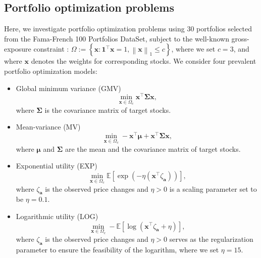 \documentclass[aos]{imsart}
\numberwithin{equation}{section}
\theoremstyle{plain}
\begin{document}
\subsection{Portfolio optimization problems}
Here, we investigate portfolio optimization problems using $30$ portfolios selected from the Fama-French 100 Portfolios DataSet, subject to the well-known gross-exposure constraint \cite{Fan2012Vast}:
$\Omega := \left\{\bm{x}: \bm{1}^{\top} \bm{x} = 1, \left\| \bm{x} \right\|_1 \leq c\right\}$,
where we set $c =3$, and where $\bm{x}$ denotes the weights for corresponding stocks. We consider four prevalent portfolio optimization models:
\begin{itemize}
        \item Global minimum variance (GMV)
        \begin{equation*}
            \min_{\bm{x} \in \Omega_c} \bm{x}^{\top} \bm{\Sigma} \bm{x},
        \end{equation*}
        where $\bm{\Sigma}$ is the covariance matrix of target stocks.

        \item Mean-variance (MV)
        \begin{equation*}
            \min_{\bm{x} \in \Omega_c}  -\bm{x}^{\top}\bm{\mu} + \bm{x}^{\top} \bm{\Sigma} \bm{x},
        \end{equation*}
        where $\bm{\mu}$ and $\bm{\Sigma}$ are the mean and the covariance matrix of target stocks.

        \item Exponential utility (EXP)
        \begin{equation*}
            \min_{\bm{x} \in \Omega_c} \mathbb{E} \left[ \exp \left(-\eta \left(\bm{x}^{\top} \zeta_{\bm{a}} \right)\right) \right],
        \end{equation*}
        where $\zeta_{\bm{a}}$ is the observed price changes and $\eta>0$ is a scaling parameter set to be $\eta= 0.1$.

        \item Logarithmic utility (LOG) 
        \begin{equation*}
            \min_{\bm{x} \in \Omega_c}  -\mathbb{E} \left[ \log \left( \bm{x}^{\top} \zeta_{\bm{a}}+ \eta \right)  \right],
        \end{equation*}
        where $\zeta_{\bm{a}}$ is the observed price changes and $\eta>0$ serves as the regularization parameter to ensure the feasibility of the logarithm, where we set $\eta=15$.
    \end{itemize}
\end{document}
